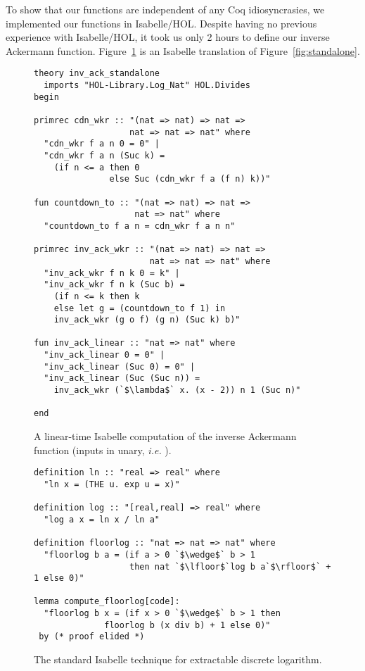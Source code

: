 To show that our functions are independent of any 
Coq idiosyncrasies,
we implemented our functions in Isabelle/HOL.  Despite having 
no previous experience with Isabelle/HOL, it took us
only 2 hours to define our inverse Ackermann function.
Figure~\ref{fig:standalone_isabelle} is an Isabelle translation of 
Figure~\ref{fig:standalone}.

\lstset{style=isaStyle}
\begin{figure}
\begin{lstlisting}
theory inv_ack_standalone
  imports "HOL-Library.Log_Nat" HOL.Divides
begin

primrec cdn_wkr :: "(nat => nat) => nat => 
                   nat => nat => nat" where
  "cdn_wkr f a n 0 = 0" |
  "cdn_wkr f a n (Suc k) = 
    (if n <= a then 0 
  	           else Suc (cdn_wkr f a (f n) k))"

fun countdown_to :: "(nat => nat) => nat => 
                    nat => nat" where
  "countdown_to f a n = cdn_wkr f a n n"

primrec inv_ack_wkr :: "(nat => nat) => nat => 
                       nat => nat => nat" where
  "inv_ack_wkr f n k 0 = k" |
  "inv_ack_wkr f n k (Suc b) = 
  	(if n <= k then k
  	else let g = (countdown_to f 1) in
    inv_ack_wkr (g o f) (g n) (Suc k) b)"

fun inv_ack_linear :: "nat => nat" where
  "inv_ack_linear 0 = 0" |
  "inv_ack_linear (Suc 0) = 0" |
  "inv_ack_linear (Suc (Suc n)) = 
  	inv_ack_wkr (`$\lambda$` x. (x - 2)) n 1 (Suc n)"
 
end
\end{lstlisting}
\caption{A linear-time Isabelle computation of the inverse Ackermann function (inputs  in unary, \emph{i.e.} ).}
\label{fig:standalone_isabelle}
\end{figure}


\begin{figure}
\begin{lstlisting}
definition ln :: "real => real" where
  "ln x = (THE u. exp u = x)"

definition log :: "[real,real] => real" where
  "log a x = ln x / ln a"

definition floorlog :: "nat => nat => nat" where
  "floorlog b a = (if a > 0 `$\wedge$` b > 1 
                   then nat `$\lfloor$`log b a`$\rfloor$` + 1 else 0)"

lemma compute_floorlog[code]:
  "floorlog b x = (if x > 0 `$\wedge$` b > 1 then 
              floorlog b (x div b) + 1 else 0)"
 by (* proof elided *)
\end{lstlisting}
\caption{The standard Isabelle technique for extractable discrete logarithm.}
\label{fig:isabelle_hack}
\end{figure}

